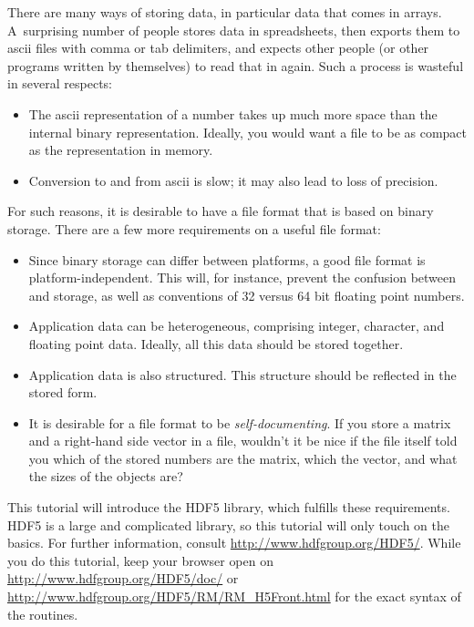 
There are many ways of storing data, in particular data that comes in
arrays. A~surprising number of people stores data in spreadsheets,
then exports them to ascii files with comma or tab delimiters, and expects other
people (or other programs written by themselves) to read that in
again. Such a process is wasteful in several respects:
\begin{itemize}
\item The ascii representation of a number takes up much more space
  than the internal binary representation. Ideally, you would want a
  file to be as compact as the representation in memory.
\item Conversion to and from ascii is slow; it may also lead to loss
  of precision.
\end{itemize}
For such reasons, it is desirable to have a file format that is based
on binary storage. There are a few more requirements on a useful file
format:
\begin{itemize}
\item Since binary storage can differ between platforms, a good file
  format is platform-independent. This will, for instance, prevent the
  confusion between  and
   storage, as well as conventions of 32
  versus 64 bit floating point numbers.  
\item Application data can be heterogeneous, comprising integer,
  character, and floating point data. Ideally, all this data should be
  stored together.
\item Application data is also structured. This structure should be
  reflected in the stored form.
\item It is desirable for a file format to be
  \emph{self-documenting}. If you store a matrix and a right-hand side
  vector in a file, wouldn't it be nice if the file itself told you
  which of the stored numbers are the matrix, which the vector, and
  what the sizes of the objects are?
\end{itemize}
This tutorial will introduce the HDF5 library, which fulfills these
requirements.
HDF5 is a large and complicated library, so this
tutorial will only touch on the basics. For
further information, consult \url{http://www.hdfgroup.org/HDF5/}.
While you do this tutorial, keep your browser open on
\url{http://www.hdfgroup.org/HDF5/doc/} or
\url{http://www.hdfgroup.org/HDF5/RM/RM_H5Front.html} 
for the exact
syntax of the routines.

